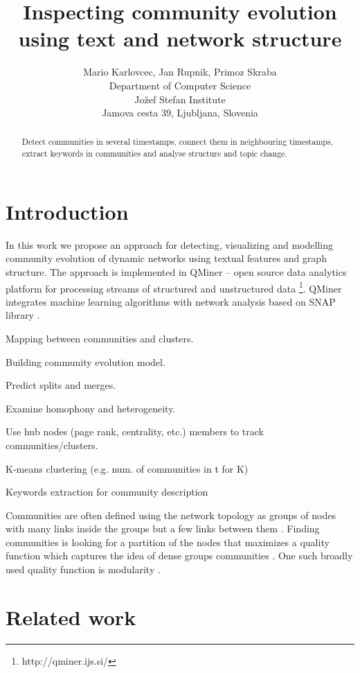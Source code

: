\documentclass{article} %
\title{Inspecting community evolution using text and network structure}
\author{
Mario Karlovcec, Jan Rupnik, Primoz Skraba \\
Department of Computer Science\\
Jožef Stefan Institute\\
Jamova cesta 39, Ljubljana, Slovenia \\
}
\begin{document}
\maketitle

\begin{abstract}
Detect communities in several timestamps, connect them in neighbouring timestamps, extract keywords in communities and analyse structure and topic change.
\end{abstract}

\section{Introduction}

In this work we propose an approach for detecting, visualizing and modelling community evolution of dynamic networks using textual features and graph structure. The approach is implemented in QMiner – open source data analytics platform for processing streams of structured and unstructured data \footnote{http://qminer.ijs.si/}. QMiner integrates machine learning algorithms with network analysis based on SNAP library \cite{snap}.

Mapping between communities and clusters.

Building community evolution model.

Predict splits and merges.

Examine homophony and heterogeneity.

Use hub nodes (page rank, centrality, etc.) members to track communities/clusters.

K-means clustering (e.g. num. of communities in t for K)

Keywords extraction for community description

Communities are often defined using the network topology as groups of nodes with many links inside the groups but a few links between them . Finding communities is looking for a partition of the nodes that maximizes a quality function which captures the idea of dense groups communities \cite{aynaud}. One such broadly used quality function is modularity \cite{newman2003}.

\section{Related work}
\end{document}
